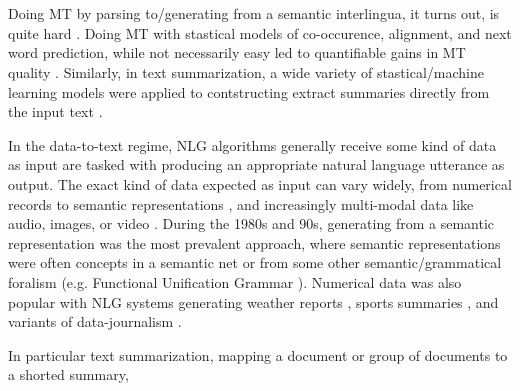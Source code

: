 
~\\~\\

Doing MT by parsing to/generating from a semantic interlingua, it turns out,
is quite hard \cite{}. Doing MT with stastical models of co-occurence,
alignment, and next word prediction, while not necessarily easy led to
quantifiable gains in MT quality \cite{}. Similarly, in text summarization,
a wide variety of stastical/machine learning models were applied to 
contstructing extract summaries directly from the input text \cite{}.












In the data-to-text regime, NLG algorithms generally receive some
kind of data as input are tasked with producing an appropriate
natural language utterance as output. 
 The exact kind of  data expected as input can vary widely, from numerical
 records \cite{} to semantic representations \cite{},  
 and increasingly multi-modal
 data like audio, images, or video \cite{}. 
 During the 1980s and 90s, generating from a semantic representation 
 was the most prevalent approach, where semantic representations were often
 concepts in a semantic net \cite{} or from some other semantic/grammatical
foralism (e.g. Functional Unification Grammar \cite{}).
Numerical data was also popular with NLG systems generating weather
reports \cite{}, sports summaries \cite{}, and variants of data-journalism \cite{}.








In particular text summarization, mapping a document or group
of documents to a shorted summary, 

